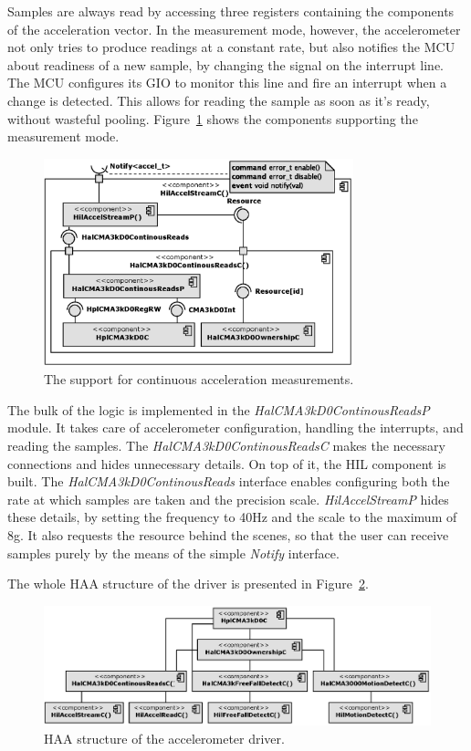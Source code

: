 Samples are always read by accessing three registers containing the components of the acceleration vector. In the measurement mode, however, the accelerometer not only tries to produce readings at a constant rate, but also notifies the MCU about readiness of a new sample, by changing the signal on the interrupt line. The MCU configures its GIO to monitor this line and fire an interrupt when a change is detected. This allows for reading the sample as soon as it's ready, without wasteful pooling. Figure~\ref{fig:hil_accel_stream_c} shows the components supporting the measurement mode.
\begin{figure}[h]
  \centering
  \includegraphics[width=0.8\textwidth]{diagrams/hil_accel_stream_c.eps}
  \caption{The support for continuous acceleration measurements.}
  \label{fig:hil_accel_stream_c}
\end{figure}

The bulk of the logic is implemented in the \emph{HalCMA3kD0ContinousReadsP} module. It takes care of accelerometer configuration, handling the interrupts, and reading the samples. The \emph{HalCMA3kD0ContinousReadsC} makes the necessary connections and hides unnecessary details. On top of it, the HIL component is built. The \emph{HalCMA3kD0ContinousReads} interface enables configuring both the rate at which samples are taken and the precision scale. \emph{HilAccelStreamP} hides these details, by setting the frequency to 40Hz and the scale to the maximum of 8g. It also requests the resource behind the scenes, so that the user can receive samples purely by the means of the simple \emph{Notify} interface.

The whole HAA structure of the driver is presented in Figure~\ref{fig:accel_haa_structure}.
\begin{figure}[h]
  \centering
  \includegraphics[width=1\textwidth]{diagrams/accel_haa_structure.eps}
  \caption{HAA structure of the accelerometer driver.}
  \label{fig:accel_haa_structure}
\end{figure}

